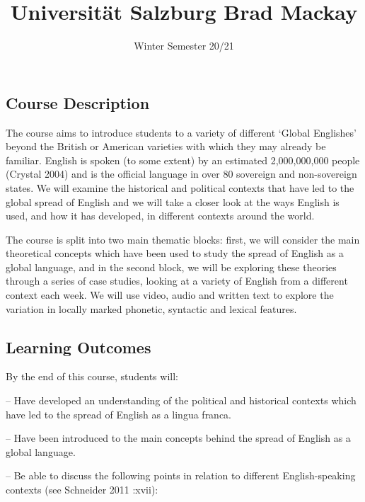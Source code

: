 \documentclass[
]{article}
\title{Universität Salzburg \textbar{} Brad Mackay}
\author{Winter Semester 20/21}
\date{}
\begin{document}
\maketitle

\hypertarget{course-description}{%
\subsection{Course Description}\label{course-description}}

The course aims to introduce students to a variety of different `Global
Englishes' beyond the British or American varieties with which they may
already be familiar. English is spoken (to some extent) by an estimated
2,000,000,000 people (Crystal 2004) and is the official language in over
80 sovereign and non-sovereign states. We will examine the historical
and political contexts that have led to the global spread of English and
we will take a closer look at the ways English is used, and how it has
developed, in different contexts around the world.

The course is split into two main thematic blocks: first, we will
consider the main theoretical concepts which have been used to study the
spread of English as a global language, and in the second block, we will
be exploring these theories through a series of case studies, looking at
a variety of English from a different context each week. We will use
video, audio and written text to explore the variation in locally marked
phonetic, syntactic and lexical features.

\hypertarget{learning-outcomes}{%
\subsection{Learning Outcomes}\label{learning-outcomes}}

By the end of this course, students will:

-- Have developed an understanding of the political and historical
contexts which have led to the spread of English as a lingua franca.

-- Have been introduced to the main concepts behind the spread of
English as a global language.

-- Be able to discuss the following points in relation to different
English-speaking contexts (see Schneider 2011 :xvii):
\end{document}
